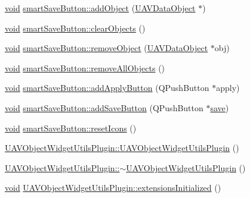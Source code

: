 \begin{DoxyCompactItemize}
\item 
\hyperlink{group___u_a_v_objects_plugin_ga444cf2ff3f0ecbe028adce838d373f5c}{void} \hyperlink{group___u_a_v_object_widget_utils_gac2164be4d041b63639a01ac473d95463}{smart\-Save\-Button\-::add\-Object} (\hyperlink{class_u_a_v_data_object}{\-U\-A\-V\-Data\-Object} $\ast$)
\item 
\hyperlink{group___u_a_v_objects_plugin_ga444cf2ff3f0ecbe028adce838d373f5c}{void} \hyperlink{group___u_a_v_object_widget_utils_ga0907c8e3ee212fbe30183359c0d8bc1a}{smart\-Save\-Button\-::clear\-Objects} ()
\item 
\hyperlink{group___u_a_v_objects_plugin_ga444cf2ff3f0ecbe028adce838d373f5c}{void} \hyperlink{group___u_a_v_object_widget_utils_ga3543686402e11b7eb8f0822c0a9bb4de}{smart\-Save\-Button\-::remove\-Object} (\hyperlink{class_u_a_v_data_object}{\-U\-A\-V\-Data\-Object} $\ast$obj)
\item 
\hyperlink{group___u_a_v_objects_plugin_ga444cf2ff3f0ecbe028adce838d373f5c}{void} \hyperlink{group___u_a_v_object_widget_utils_ga2e09103bceedaf1f2756c7a688da035c}{smart\-Save\-Button\-::remove\-All\-Objects} ()
\item 
\hyperlink{group___u_a_v_objects_plugin_ga444cf2ff3f0ecbe028adce838d373f5c}{void} \hyperlink{group___u_a_v_object_widget_utils_gab4059d84ec9c8e40beed303a7ad8550a}{smart\-Save\-Button\-::add\-Apply\-Button} (\-Q\-Push\-Button $\ast$apply)
\item 
\hyperlink{group___u_a_v_objects_plugin_ga444cf2ff3f0ecbe028adce838d373f5c}{void} \hyperlink{group___u_a_v_object_widget_utils_ga85e413cf895d8a514e748a8ebf6a67ec}{smart\-Save\-Button\-::add\-Save\-Button} (\-Q\-Push\-Button $\ast$\hyperlink{uavobjecttemplate_8m_a79178933c5b76091ca04178d14a5ba98}{save})
\item 
\hyperlink{group___u_a_v_objects_plugin_ga444cf2ff3f0ecbe028adce838d373f5c}{void} \hyperlink{group___u_a_v_object_widget_utils_ga851955edd99204e2b209b7fa604129fe}{smart\-Save\-Button\-::reset\-Icons} ()
\item 
\hyperlink{group___u_a_v_object_widget_utils_ga71c193fdd4f73fd349dbb72db72a1d05}{\-U\-A\-V\-Object\-Widget\-Utils\-Plugin\-::\-U\-A\-V\-Object\-Widget\-Utils\-Plugin} ()
\item 
\hyperlink{group___u_a_v_object_widget_utils_ga2c7561526e629a5fcaa9bf2def2a4b8c}{\-U\-A\-V\-Object\-Widget\-Utils\-Plugin\-::$\sim$\-U\-A\-V\-Object\-Widget\-Utils\-Plugin} ()
\item 
\hyperlink{group___u_a_v_objects_plugin_ga444cf2ff3f0ecbe028adce838d373f5c}{void} \hyperlink{group___u_a_v_object_widget_utils_ga8538f7844616deeef2455da33bc8a9fe}{\-U\-A\-V\-Object\-Widget\-Utils\-Plugin\-::extensions\-Initialized} ()

\end{DoxyCompactItemize}
